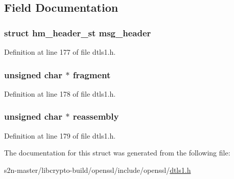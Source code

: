 \subsection{Field Documentation}
\subsubsection[{\texorpdfstring{msg\+\_\+header}{msg_header}}]{\setlength{\rightskip}{0pt plus 5cm}struct {\bf hm\+\_\+header\+\_\+st} msg\+\_\+header}\hypertarget{structhm__fragment__st_a7bca8bef88f269e9afece0be547478b2}{}\label{structhm__fragment__st_a7bca8bef88f269e9afece0be547478b2}


Definition at line 177 of file dtls1.\+h.

\subsubsection[{\texorpdfstring{fragment}{fragment}}]{\setlength{\rightskip}{0pt plus 5cm}unsigned char $\ast$ fragment}\hypertarget{structhm__fragment__st_a0a362b34ba3097260f0abf68ff25f03a}{}\label{structhm__fragment__st_a0a362b34ba3097260f0abf68ff25f03a}


Definition at line 178 of file dtls1.\+h.

\subsubsection[{\texorpdfstring{reassembly}{reassembly}}]{\setlength{\rightskip}{0pt plus 5cm}unsigned char $\ast$ reassembly}\hypertarget{structhm__fragment__st_acee83a8b519b7df1797ab14a8cf805b0}{}\label{structhm__fragment__st_acee83a8b519b7df1797ab14a8cf805b0}


Definition at line 179 of file dtls1.\+h.



The documentation for this struct was generated from the following file\+:\begin{DoxyCompactItemize}
\item 
s2n-\/master/libcrypto-\/build/openssl/include/openssl/\hyperlink{include_2openssl_2dtls1_8h}{dtls1.\+h}\end{DoxyCompactItemize}
